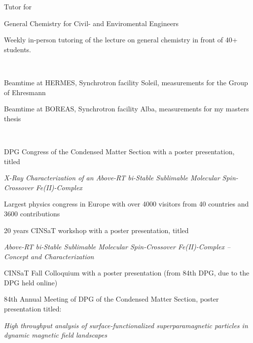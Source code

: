 \begin{tightemize}
\item Tutor for \begin{em}
General Chemistry for Civil- and Enviromental Engineers
\end{em}

Weekly in-person tutoring of the lecture on general chemistry in front of 40+ students.
\end{tightemize}

\sectionsep
{}\\
\begin{tightemize}
\item Beamtime at HERMES, Synchrotron facility Soleil, measurements for the Group of Ehresmann
\end{tightemize}
\begin{tightemize}
\item Beamtime at BOREAS, Synchrotron facility Alba, measurements for my masters thesis
\end{tightemize}

\sectionsep

 \\
\begin{tightemize}
\item DPG Congress of the Condensed Matter Section with a poster presentation, titled

\textit{X-Ray Characterization of an Above-RT bi-Stable Sublimable Molecular Spin-Crossover Fe(II)-Complex}



Largest physics congress in Europe with over 4000 visitors from 40 countries and 3600 contributions
\end{tightemize}
\begin{tightemize}
\item 20 years CINSaT workshop with a poster presentation, titled

\textit{Above-RT bi-Stable Sublimable Molecular Spin-Crossover
Fe(II)-Complex – Concept and Characterization}
\end{tightemize}
\begin{tightemize}
\item CINSaT Fall Colloquium with a poster presentation (from 84th DPG, due to the DPG held online) 
\end{tightemize}
\begin{tightemize}
\item 84th Annual Meeting of DPG of the Condensed Matter Section, poster presentation titled:

\textit{High throughput analysis of surface-functionalized superparamagnetic particles in dynamic magnetic field landscapes}
\end{tightemize}

